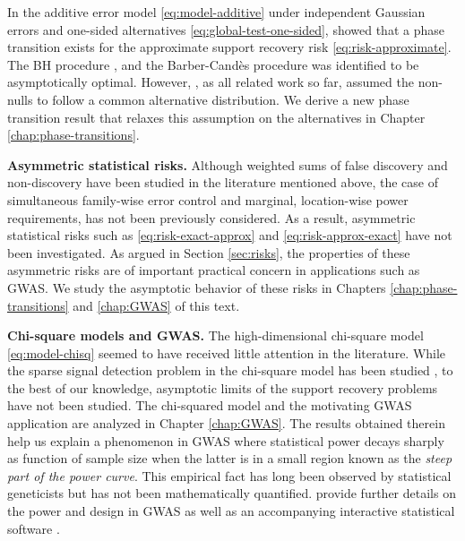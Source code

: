 In the additive error model \eqref{eq:model-additive} under independent Gaussian errors and one-sided alternatives \eqref{eq:global-test-one-sided},
\cite{arias2017distribution} showed that a phase transition exists for  the approximate support recovery risk \eqref{eq:risk-approximate}.
The \ac{BH} procedure \cite{benjamini1995controlling}, and the Barber-Cand\`es procedure \citep{barber2015controlling} was identified to be asymptotically optimal. %
However, \cite{arias2017distribution}, as all related work so far, assumed the non-nulls to follow a common alternative distribution.
We derive a new phase transition result that relaxes this assumption on the alternatives in Chapter \ref{chap:phase-transitions}.

\medskip

{\bf Asymmetric statistical risks.}
Although weighted sums of false discovery and non-discovery have been studied in the literature mentioned above, the case of simultaneous family-wise error control and marginal, location-wise power requirements, has not been previously considered. 
As a result, asymmetric statistical risks such as \eqref{eq:risk-exact-approx} and \eqref{eq:risk-approx-exact} have not 
been investigated.
As argued in Section \ref{sec:risks}, the properties of these asymmetric risks are of important practical concern in applications such as GWAS.
We study the asymptotic behavior of these risks in Chapters \ref{chap:phase-transitions} and \ref{chap:GWAS} of this text.

\medskip

{\bf Chi-square models and GWAS.}
The high-dimensional chi-square model \eqref{eq:model-chisq} seemed to have received little attention in the literature.
While the sparse signal detection problem in the chi-square model has been studied \cite{donoho2004higher}, to the best of our knowledge,  asymptotic limits of the support recovery problems have not been studied.
The chi-squared model and the motivating GWAS application are analyzed in Chapter \ref{chap:GWAS}.
The results obtained therein help us explain a phenomenon in GWAS where statistical power decays sharply as function of sample size when the latter is in a small region known as the {\em steep part of the power curve}.  
This empirical fact has long been observed by statistical geneticists but has not been mathematically quantified.  \cite{gao2019upass} provide further details on the power and design in GWAS as well as an accompanying interactive statistical software \citep{gaoUPASS_ShinyApp}.

